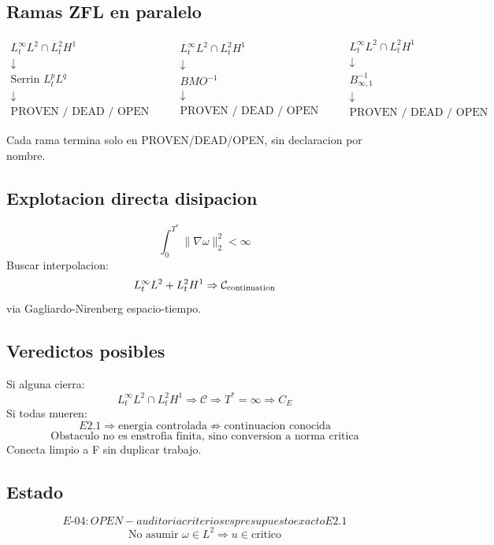 \documentclass[11pt]{article}
\begin{document}
\subsection*{Ramas ZFL en paralelo}
\[
\begin{array}{c}
L^\infty_tL^2\cap L^2_tH^1\\
\downarrow\\
\text{Serrin }L^p_tL^q\\
\downarrow\\
\text{PROVEN / DEAD / OPEN}
\end{array}
\qquad
\begin{array}{c}
L^\infty_tL^2\cap L^2_tH^1\\
\downarrow\\
BMO^{-1}\\
\downarrow\\
\text{PROVEN / DEAD / OPEN}
\end{array}
\qquad
\begin{array}{c}
L^\infty_tL^2\cap L^2_tH^1\\
\downarrow\\
B^{-1}_{\infty,1}\\
\downarrow\\
\text{PROVEN / DEAD / OPEN}
\end{array}
\]

Cada rama termina solo en PROVEN/DEAD/OPEN, sin declaracion por nombre.

\subsection*{Explotacion directa disipacion}
\[
\int_0^{T^*}\|\nabla\omega\|_2^2<\infty
\]
Buscar interpolacion:
\[
L^\infty_tL^2+L^2_tH^1\Rightarrow\mathcal C_{\rm continuation}
\]
via Gagliardo-Nirenberg espacio-tiempo.

\subsection*{Veredictos posibles}
Si alguna cierra:
\[
\boxed{L^\infty_tL^2\cap L^2_tH^1\Rightarrow\mathcal C\Rightarrow T^*=\infty\Rightarrow C_E}
\]
Si todas mueren:
\[
\boxed{E2.1\Rightarrow\text{energia controlada}\not\Rightarrow\text{continuacion conocida}}
\]
\[
\boxed{\text{Obstaculo no es enstrofia finita, sino conversion a norma critica}}
\]
Conecta limpio a F sin duplicar trabajo.

\subsection*{Estado}
\[
\boxed{E\text{-}04: OPEN - auditoria criterios vs presupuesto exacto E2.1}
\]
\[
\boxed{\text{No asumir } \omega\in L^2\Rightarrow u\in\text{critico}}
\]
\end{document}
